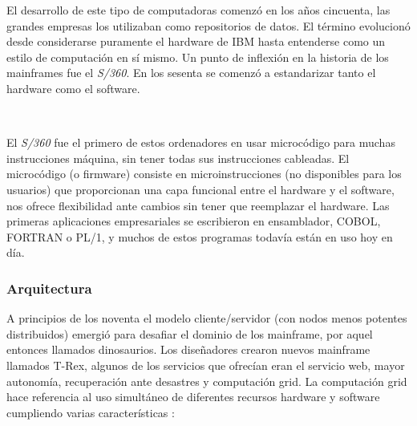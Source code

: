 \documentclass[paper=a4, fontsize=10pt]{scrartcl} %
\numberwithin{equation}{section} %
\numberwithin{figure}{section} %
\numberwithin{table}{section} %
\begin{document}
El desarrollo de este tipo de computadoras comenzó en los años cincuenta, las grandes empresas los utilizaban como repositorios de datos.
El término evolucionó desde considerarse puramente el hardware de IBM hasta entenderse como un estilo de computación en sí mismo.
Un punto de inflexión en la historia de los mainframes fue el \textit{S/360}.
En los sesenta se comenzó a estandarizar tanto el hardware como el software.

\

El \textit{S/360} fue el primero de estos ordenadores en usar microcódigo para muchas instrucciones máquina, sin tener todas sus instrucciones cableadas. 
El microcódigo (o firmware) consiste en microinstrucciones (no disponibles para los usuarios) que proporcionan una capa funcional entre el hardware y el software, nos ofrece flexibilidad ante cambios sin tener que reemplazar el hardware.
Las primeras aplicaciones empresariales se escribieron en ensamblador, COBOL, FORTRAN o PL/1, y muchos de estos programas todavía están en uso hoy en día.

\subsubsection{Arquitectura}
A principios de los noventa el modelo cliente/servidor (con nodos menos potentes distribuidos) emergió para desafiar el dominio de los mainframe, por aquel entonces llamados dinosaurios.
Los diseñadores crearon nuevos mainframe llamados T-Rex, algunos de los servicios que ofrecían eran el servicio web, mayor autonomía, recuperación ante desastres y computación grid.
La computación grid hace referencia al uso simultáneo de diferentes recursos hardware y software cumpliendo varias características \cite{grid-def}:
\end{document}
